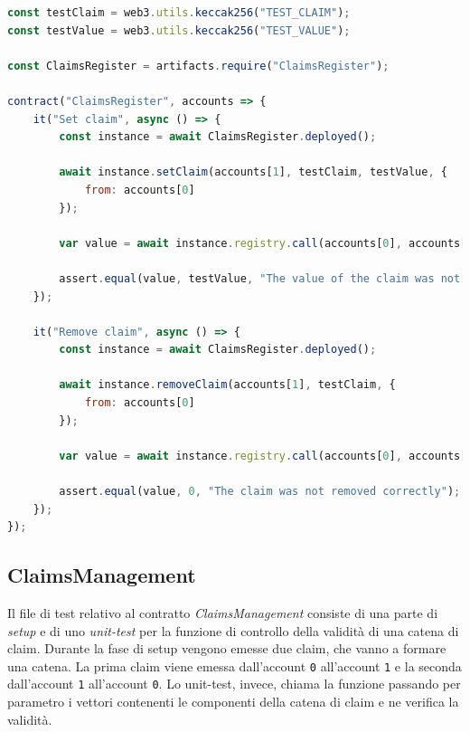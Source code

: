 \noindent
\begin{minipage}{\linewidth}
\begin{lstlisting}[language=JavaScript]
const testClaim = web3.utils.keccak256("TEST_CLAIM");
const testValue = web3.utils.keccak256("TEST_VALUE");

const ClaimsRegister = artifacts.require("ClaimsRegister");

contract("ClaimsRegister", accounts => {
    it("Set claim", async () => {
        const instance = await ClaimsRegister.deployed();

        await instance.setClaim(accounts[1], testClaim, testValue, {
            from: accounts[0]
        });

        var value = await instance.registry.call(accounts[0], accounts[1], testClaim);

        assert.equal(value, testValue, "The value of the claim was not set correctly");
    });

    it("Remove claim", async () => {
        const instance = await ClaimsRegister.deployed();

        await instance.removeClaim(accounts[1], testClaim, {
            from: accounts[0]
        });

        var value = await instance.registry.call(accounts[0], accounts[1], testClaim);

        assert.equal(value, 0, "The claim was not removed correctly");
    });
});
\end{lstlisting}
\end{minipage}

\subsection{ClaimsManagement}
Il file di test relativo al contratto \emph{ClaimsManagement} consiste di una parte di \emph{setup} e di uno \emph{unit-test} per la funzione di controllo della validità di una catena di claim. Durante la fase di setup vengono emesse due claim, che vanno a formare una catena. La prima claim viene emessa dall'account \texttt{0} all'account \texttt{1} e la seconda dall'account \texttt{1} all'account \texttt{0}. Lo unit-test, invece, chiama la funzione passando per parametro i vettori contenenti le componenti della catena di claim e ne verifica la validità.

